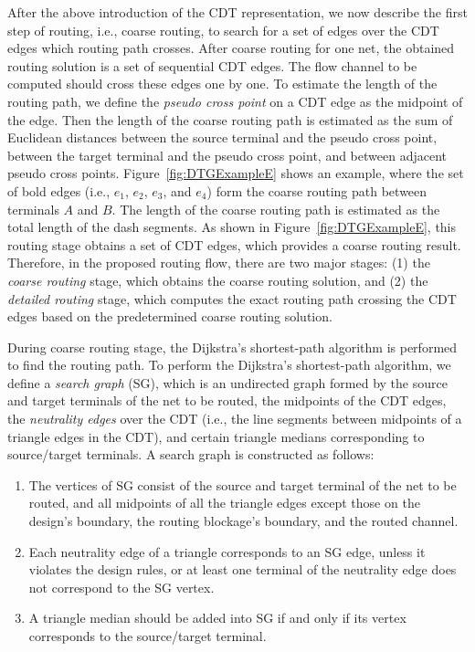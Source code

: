 \documentclass[journal]{IEEEtran}
\begin{document}
After the above introduction of the CDT representation, we now describe the first step of routing, i.e., coarse routing, to search for a set of edges over the CDT edges which routing path crosses. 
After coarse routing for one net, the obtained routing solution is 
a set of sequential CDT edges. 
The flow channel to be computed should cross these edges one by one. 
To estimate the length of the routing path, we define the {\em pseudo cross point} on a CDT edge as the midpoint of the edge. 
Then the length of the coarse routing path is estimated as the sum of Euclidean distances between the source terminal and the pseudo cross point,
between the target terminal and the pseudo cross point, and between adjacent pseudo cross points. 
Figure~\ref{fig:DTGExampleE} shows an example, where the set of bold edges 
(i.e., $e_1$, $e_2$, $e_3$, and $e_4$) form the coarse routing path 
between terminals $A$ and $B$. The length of the coarse routing path 
is estimated as the total length of the dash segments. 
As shown in Figure~\ref{fig:DTGExampleE}, this routing stage 
obtains a set of CDT edges, which provides a coarse routing result. 
Therefore, in the proposed routing flow, there are two major stages: 
(1) the {\em coarse routing} stage, which obtains the coarse routing 
solution, and (2) the {\em detailed routing} stage, which computes the exact 
routing path crossing the CDT edges based on the predetermined 
coarse routing solution.

During coarse routing stage, the Dijkstra's shortest-path algorithm is performed to find the routing path.
To perform the Dijkstra's shortest-path algorithm, we define a {\em search graph} (SG), which is an undirected graph formed by the source and target terminals of the net to be routed, the midpoints of the CDT edges, the {\em neutrality edges} over the CDT (i.e., the line segments between midpoints of a triangle edges in the CDT), and certain triangle medians corresponding to source/target terminals. A search graph is constructed as follows:

\begin{enumerate}
\item The vertices of SG consist of the source and target terminal of the net to be routed, and all midpoints of all the triangle edges except those on the design's boundary, the routing blockage's boundary, and the routed channel.
\item Each neutrality edge of a triangle corresponds to an SG edge, unless it violates the design rules, or at least one terminal of the neutrality edge does not correspond to the SG vertex.
\item A triangle median should be added into SG if and only if its vertex corresponds to the source/target terminal.
\end{enumerate}
\end{document}
